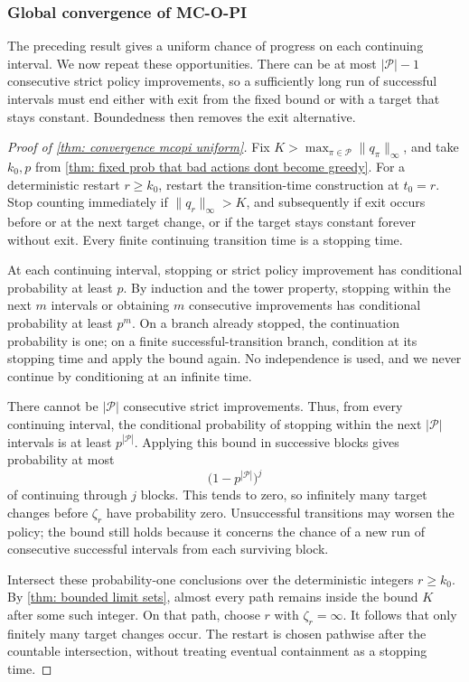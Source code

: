 \subsubsection{Global convergence of MC-O-PI}
The preceding result gives a uniform chance of progress on each continuing interval. We now repeat these opportunities. There can be at most $|\mathcal P|-1$ consecutive strict policy improvements, so a sufficiently long run of successful intervals must end either with exit from the fixed bound or with a target that stays constant. Boundedness then removes the exit alternative.

\begin{proof}[Proof of \autoref{thm: convergence mcopi uniform}]
Fix $K>\max_{\pi\in\mathcal P}\|q_\pi\|_\infty$, and take $k_0,p$ from \autoref{thm: fixed prob that bad actions dont become greedy}. For a deterministic restart $r\ge k_0$, restart the transition-time construction at $t_0=r$. Stop counting immediately if $\|q_r\|_\infty>K$, and subsequently if exit occurs before or at the next target change, or if the target stays constant forever without exit. Every finite continuing transition time is a stopping time.

At each continuing interval, stopping or strict policy improvement has conditional probability at least $p$. By induction and the tower property, stopping within the next $m$ intervals or obtaining $m$ consecutive improvements has conditional probability at least $p^m$. On a branch already stopped, the continuation probability is one; on a finite successful-transition branch, condition at its stopping time and apply the bound again. No independence is used, and we never continue by conditioning at an infinite time.

There cannot be $|\mathcal P|$ consecutive strict improvements. Thus, from every continuing interval, the conditional probability of stopping within the next $|\mathcal P|$ intervals is at least $p^{|\mathcal P|}$. Applying this bound in successive blocks gives probability at most
\[
\big(1-p^{|\mathcal P|}\big)^j
\]
of continuing through $j$ blocks. This tends to zero, so infinitely many target changes before $\zeta_r$ have probability zero. Unsuccessful transitions may worsen the policy; the bound still holds because it concerns the chance of a new run of consecutive successful intervals from each surviving block.

Intersect these probability-one conclusions over the deterministic integers $r\ge k_0$. By \autoref{thm: bounded limit sets}, almost every path remains inside the bound $K$ after some such integer. On that path, choose $r$ with $\zeta_r=\infty$. It follows that only finitely many target changes occur. The restart is chosen pathwise after the countable intersection, without treating eventual containment as a stopping time.


\end{proof}
